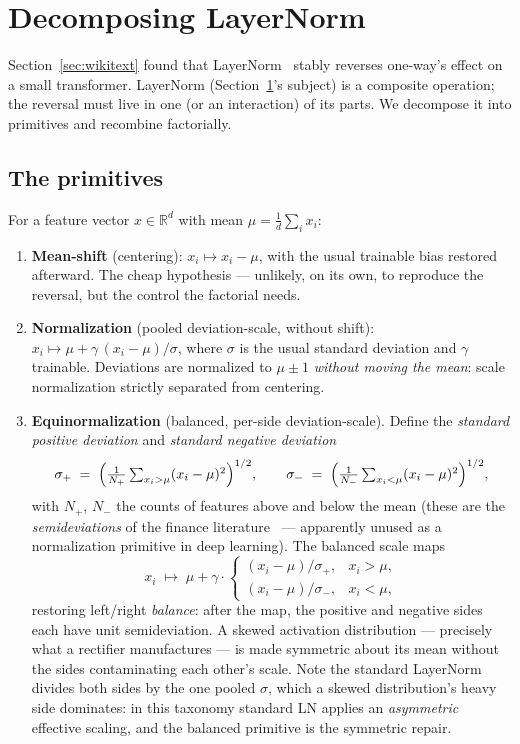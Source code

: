 \documentclass[11pt]{article}
\begin{document}
\section{Decomposing LayerNorm}
\label{sec:ln-decomposition}

Section~\ref{sec:wikitext} found that LayerNorm~\cite{ba2016}
stably reverses one-way's effect on a small transformer. LayerNorm
(Section~\ref{sec:ln-decomposition}'s subject) is a composite
operation; the reversal
must live in one (or an interaction) of its parts. We decompose it
into primitives and recombine factorially.

\subsection{The primitives}

For a feature vector $x \in \mathbb{R}^d$ with mean
$\mu = \tfrac1d \sum_i x_i$:

\begin{enumerate}
\item \textbf{Mean-shift} (centering): $x_i \mapsto x_i - \mu$,
with the usual trainable bias restored afterward. The cheap
hypothesis --- unlikely, on its own, to reproduce the reversal, but
the control the factorial needs.
\item \textbf{Normalization} (pooled deviation-scale, without
shift):
$x_i \mapsto \mu + \gamma\,(x_i - \mu)/\sigma$, where $\sigma$ is
the usual standard deviation and $\gamma$ trainable. Deviations are
normalized to $\mu \pm 1$ \emph{without moving the mean}: scale
normalization strictly separated from centering.
\item \textbf{Equinormalization} (balanced, per-side
deviation-scale). Define the
\emph{standard positive deviation} and \emph{standard negative
deviation}
\[
\sigma_{+} \;=\; \Bigl(\tfrac{1}{N_{+}} \textstyle\sum_{x_i > \mu}
(x_i - \mu)^2 \Bigr)^{1/2},
\qquad
\sigma_{-} \;=\; \Bigl(\tfrac{1}{N_{-}} \textstyle\sum_{x_i < \mu}
(x_i - \mu)^2 \Bigr)^{1/2},
\]
with $N_{+}$, $N_{-}$ the counts of features above and below the
mean (these are the \emph{semideviations} of the finance
literature~\cite{markowitz} --- apparently unused as a
normalization primitive in deep learning). The balanced scale maps
\[
x_i \;\mapsto\; \mu + \gamma \cdot
\begin{cases}
(x_i - \mu)/\sigma_{+}, & x_i > \mu,\\[2pt]
(x_i - \mu)/\sigma_{-}, & x_i < \mu,
\end{cases}
\]
restoring left/right \emph{balance}: after the map, the positive and
negative sides each have unit semideviation. A skewed activation
distribution --- precisely what a rectifier manufactures --- is made
symmetric about its mean without the sides contaminating each
other's scale. Note the standard LayerNorm divides both sides by the
one pooled $\sigma$, which a skewed distribution's heavy side
dominates: in this taxonomy standard LN applies an
\emph{asymmetric} effective scaling, and the balanced primitive is
the symmetric repair.
\end{enumerate}
\end{document}
